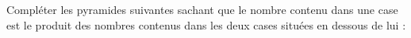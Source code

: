 
\begin{exercice}\label{exosmath-0756}

Compléter les pyramides suivantes sachant que le nombre contenu dans une case est le produit des nombres contenus dans les deux cases situées en dessous de lui :


\begin{multicols}{2}

\begin{center}
   
\end{center}

\columnbreak

\begin{center}
   
\end{center}

\end{multicols}

\end{exercice}
